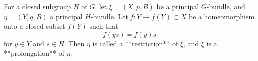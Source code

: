 For a closed subgroup $H$ of $G$, let $\xi = (X, p, B)$ be a principal $G$-bundle, and $\eta = (Y, q, B)$ a principal $H$-bundle. Let $f: Y \rightarrow f(Y) \subset X$ be a homeomorphism onto a closed subset $f(Y)$ such that
$$
f(ys) = f(y)s
$$
for $y \in Y$ and $s \in H$. Then $\eta$ is called a **restriction** of $\xi$, and $\xi$ is a **prolongation** of $\eta$.

